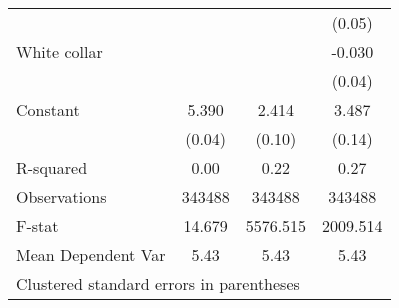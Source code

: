 {\begin{tabular}{l*{3}{c}}
                    &                     &                     &      (0.05)         \\
White collar        &                     &                     &      -0.030         \\
                    &                     &                     &      (0.04)         \\
Constant            &       5.390\sym{***}&       2.414\sym{***}&       3.487\sym{***}\\
                    &      (0.04)         &      (0.10)         &      (0.14)         \\
\hline
R-squared           &        0.00         &        0.22         &        0.27         \\
Observations        &      343488         &      343488         &      343488         \\
F-stat              &      14.679         &    5576.515         &    2009.514         \\
Mean Dependent Var  &        5.43         &        5.43         &        5.43         \\
\hline\hline
\multicolumn{4}{l}{\footnotesize Clustered standard errors in parentheses}\\
\end{tabular}
}

